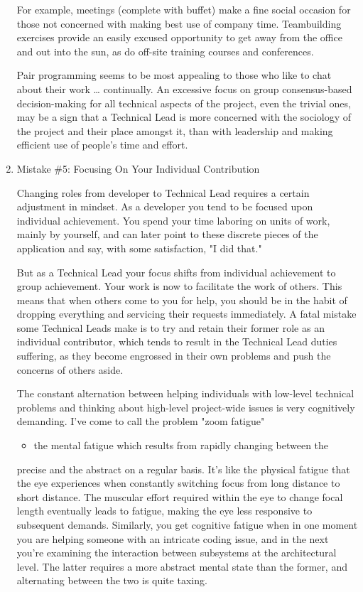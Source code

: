 \documentclass{article}
\begin{document}
\begin{enumerate}
For example, meetings (complete with buffet) make a fine social occasion
for those not concerned with making best use of company time.
Teambuilding exercises provide an easily excused opportunity to get away
from the office and out into the sun, as do off-site training courses
and conferences.

Pair programming seems to be most appealing to those who like to chat
about their work \ldots{} continually. An excessive focus on group
consensus-based decision-making for all technical aspects of the
project, even the trivial ones, may be a sign that a Technical Lead is
more concerned with the sociology of the project and their place amongst
it, than with leadership and making efficient use of people's time and
effort.

\item Mistake \#5: Focusing On Your Individual Contribution
\label{sec:orgheadline148}

Changing roles from developer to Technical Lead requires a certain
adjustment in mindset. As a developer you tend to be focused upon
individual achievement. You spend your time laboring on units of work,
mainly by yourself, and can later point to these discrete pieces of the
application and say, with some satisfaction, "I did that."

But as a Technical Lead your focus shifts from individual achievement to
group achievement. Your work is now to facilitate the work of others.
This means that when others come to you for help, you should be in the
habit of dropping everything and servicing their requests immediately. A
fatal mistake some Technical Leads make is to try and retain their
former role as an individual contributor, which tends to result in the
Technical Lead duties suffering, as they become engrossed in their own
problems and push the concerns of others aside.

The constant alternation between helping individuals with low-level
technical problems and thinking about high-level project-wide issues is
very cognitively demanding. I've come to call the problem "zoom fatigue"
\begin{itemize}
\item the mental fatigue which results from rapidly changing between the
\end{itemize}
precise and the abstract on a regular basis. It's like the physical
fatigue that the eye experiences when constantly switching focus from
long distance to short distance. The muscular effort required within the
eye to change focal length eventually leads to fatigue, making the eye
less responsive to subsequent demands. Similarly, you get cognitive
fatigue when in one moment you are helping someone with an intricate
coding issue, and in the next you're examining the interaction between
subsystems at the architectural level. The latter requires a more
abstract mental state than the former, and alternating between the two
is quite taxing.


\end{enumerate}
\end{document}
